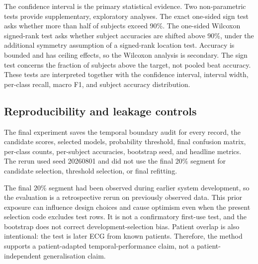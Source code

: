 The confidence interval is the primary statistical evidence. Two
non-parametric tests provide supplementary, exploratory analyses. The exact one-sided sign
test asks whether more than half of subjects exceed 90\%. The one-sided
Wilcoxon signed-rank test asks whether subject accuracies are shifted above
90\%, under the additional symmetry assumption of a signed-rank location
test. Accuracy is bounded and has ceiling effects, so the Wilcoxon analysis is
secondary. The sign test concerns the fraction of subjects above the target,
not pooled beat accuracy. These tests are interpreted together with the confidence interval,
interval width, per-class recall, macro F1, and subject accuracy distribution.

\subsection{Reproducibility and leakage controls}

The final experiment saves the temporal boundary audit for every record, the
candidate scores, selected models, probability threshold, final confusion
matrix, per-class counts, per-subject accuracies, bootstrap seed, and headline
metrics. The rerun used seed 20260801 and did not use the final 20\% segment
for candidate selection, threshold selection, or final refitting.

The final 20\% segment had been observed during earlier system development, so
the evaluation is a retrospective rerun on previously observed data.
This prior exposure can influence design choices and cause optimism even
when the present selection code excludes test rows. It is not a confirmatory
first-use test, and the bootstrap does not correct development-selection bias. Patient overlap is
also intentional: the test is later ECG from known patients. Therefore, the
method supports a patient-adapted temporal-performance claim, not a
patient-independent generalisation claim.
